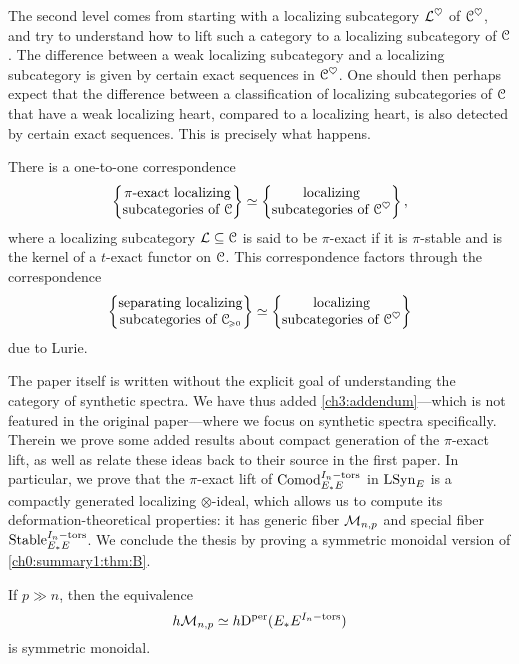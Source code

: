 The second level comes from starting with a localizing subcategory $\mathcal{L}^\heartsuit$ of $\EuScript{C}^\heartsuit$, and try to understand how to lift such a category to a localizing subcategory of $\EuScript{C}$. The difference between a weak localizing subcategory and a localizing subcategory is given by certain exact sequences in $\EuScript{C}^\heartsuit$. One should then perhaps expect that the difference between a classification of localizing subcategories of $\EuScript{C}$ that have a weak localizing heart, compared to a localizing heart, is also detected by certain exact sequences. This is precisely what happens.

\begin{theorem}
    There is a one-to-one correspondence
    \[\left\{ \begin{matrix} \pi\text{-exact localizing}\\ \text{subcategories of }\EuScript{C} \end{matrix} \right\} \simeq \left\{ \begin{matrix} \text{localizing}\\ \text{subcategories of }\EuScript{C}^\heartsuit \end{matrix} \right\},\]
    where a localizing subcategory $\mathcal{L}\subseteq \EuScript{C}$ is said to be $\pi$-exact if it is $\pi$-stable and is the kernel of a $t$-exact functor on $\EuScript{C}$. This correspondence factors through the correspondence
    \[\left\{ \begin{matrix} \text{separating localizing}\\ \text{subcategories of }\EuScript{C}_{\hspace{-1pt}\scriptscriptstyle\geqslant 0} \end{matrix} \right\} \simeq \left\{ \begin{matrix} \text{localizing}\\ \text{subcategories of }\EuScript{C}^\heartsuit \end{matrix} \right\}\]
    due to Lurie. 
\end{theorem}

The paper itself is written without the explicit goal of understanding the category of synthetic spectra. We have thus added \cref{ch3:addendum}---which is not featured in the original paper---where we focus on synthetic spectra specifically. Therein we prove some added results about compact generation of the $\pi$-exact lift, as well as relate these ideas back to their source in the first paper. In particular, we prove that the $\pi$-exact lift of $\mathrm{Comod}_{E_*E}^{I_n-\mathrm{tors}}$ in $\mathrm{LSyn}_{E}$ is a compactly generated localizing $\otimes$-ideal, which allows us to compute its deformation-theoretical properties: it has generic fiber $\mathcal{M}_{n,p}$ and special fiber $\mathrm{Stable}_{E_*E}^{I_n-\mathrm{tors}}$. We conclude the thesis by proving a symmetric monoidal version of \cref{ch0:summary1:thm:B}. 

\begin{theorem}
    If $p\gg n$, then the equivalence
    \[h\mathcal{M}_{n,p} \simeq h \mathrm{D}^{\mathrm{per}}(E_*E^{I_n-\mathrm{tors}})\] 
    is symmetric monoidal. 
\end{theorem}
